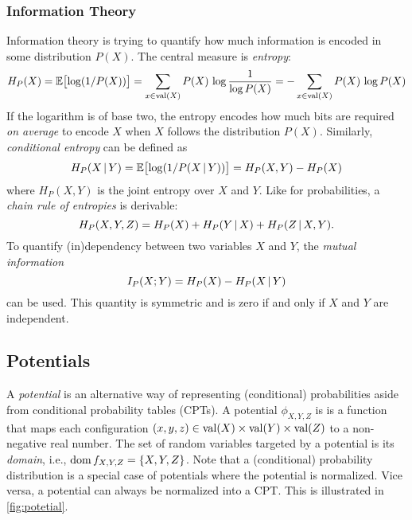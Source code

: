 			\subsubsection{Information Theory}
				Information theory is trying to quantify how much information is encoded in some distribution \(P(X)\). The central measure is \emph{entropy}:
				\begin{equation}
					H_P(X)
					= \mathbb{E}\bigl[ \log(1/P(X)) \bigr]
					= \sum_{x \in \operatorname{val}(X)} P(X) \,\log \frac{1}{\log P(X)}
					= -\sum_{x \in \operatorname{val}(X)} P(X) \,\log P(X)
				\end{equation}
				If the logarithm is of base two, the entropy encodes how much bits are required \emph{on average} to encode \(X\) when \(X\) follows the distribution \(P(X)\). Similarly, \emph{conditional entropy} can be defined as
				\begin{equation}
					H_P(X \,\vert\, Y)
					= \mathbb{E}\bigl[ \log(1/P(X \,\vert\, Y)) \bigr]
					= H_P(X, Y) - H_P(X)
				\end{equation}
				where \( H_P(X, Y) \) is the joint entropy over \(X\) and \(Y\). Like for probabilities, a \emph{chain rule of entropies} is derivable:
				\begin{equation}
					H_P(X, Y, Z) = H_P(X) + H_P(Y \,\vert\, X) + H_P(Z \,\vert\, X, Y).
				\end{equation}
				To quantify (in)dependency between two variables \(X\) and \(Y\), the \emph{mutual information}
				\begin{equation}
					I_P(X; Y) = H_P(X) - H_P(X \,\vert\, Y)
				\end{equation}
				can be used. This quantity is symmetric and is zero if and only if \(X\) and \(Y\) are independent.

		\subsection{Potentials}
			A \emph{potential} is an alternative way of representing (conditional) probabilities aside from conditional probability tables (CPTs). A potential \(\phi_{X, Y, Z}\) is is a function that maps each configuration \( (x, y, z) \in \operatorname{val}(X) \times \operatorname{val}(Y) \times \operatorname{val}(Z) \) to a non-negative real number. The set of random variables targeted by a potential is its \emph{domain}, i.e., \( \operatorname{dom} f_{X, Y, Z} = \{ X, Y, Z \} \). Note that a (conditional) probability distribution is a special case of potentials where the potential is normalized. Vice versa, a potential can always be normalized into a CPT. This is illustrated in \autoref{fig:potetial}.


